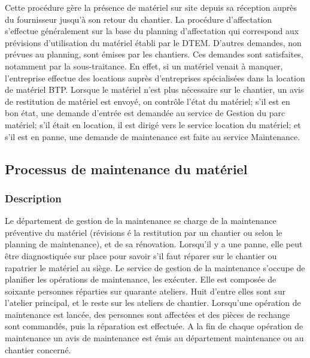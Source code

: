 				Cette procédure gère la présence de matériel sur site depuis sa réception auprès du fournisseur jusqu'à son retour du chantier.
				\newline
				La procédure d'affectation s'effectue généralement sur la base du planning d'affectation qui correspond aux prévisions d'utilisation du matériel établi par le DTEM. D'autres demandes, non prévues au planning, sont émises par les chantiers. Ces demandes sont satisfaites, notamment par la sous-traitance. 
				\newline
				En effet, si un matériel venait à manquer, l'entreprise effectue des locations auprès d'entreprises spécialisées dans la location de matériel BTP. Lorsque le matériel n'est plus nécessaire sur le chantier, un avis de restitution de matériel est envoyé, on contrôle l'état du matériel; s'il est en bon état, une demande d'entrée est demandée au service de Gestion du parc matériel; s'il était en location, il est dirigé vers le service location du matériel; et s'il est en panne, une demande de maintenance est faite au service Maintenance.


				
				
				
		\subsection{Processus de maintenance du matériel}
				\subsubsection{Description}
				
				Le département de gestion de la maintenance se charge de la maintenance préventive du matériel (révisions é la restitution par un chantier ou selon le planning de maintenance), et de sa rénovation. Lorsqu'il y a une panne, elle peut être diagnostiquée sur place pour savoir s'il faut réparer sur le chantier ou rapatrier le matériel au siège.
				\newline
				Le service de gestion de la maintenance s'occupe de planifier les opérations de maintenance, les exécuter. Elle est composée de soixante personnes réparties sur quarante ateliers. Huit d'entre elles sont sur l'atelier principal, et le reste sur les ateliers de chantier. Lorsqu'une opération de maintenance est lancée, des personnes sont affectées et des pièces de rechange sont commandés, puis la réparation est effectuée. A la fin de chaque opération de maintenance un avis de maintenance est émis au département maintenance ou au chantier concerné.
				
